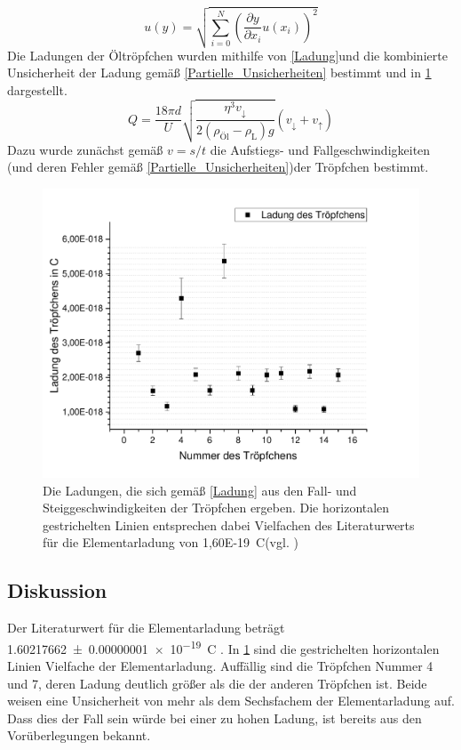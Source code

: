 \documentclass[
	a4paper,
	12pt,
	pagesize,
	ngerman
]{scrartcl}
\begin{document}
	\begin{equation}
	u(y) = \sqrt{  \sum_{i=0}^{N} \left( \frac{\partial y}{\partial x_i}u(x_i)\right)^2  }
	\label{Partielle_Unsicherheiten}
	\end{equation}
	Die Ladungen der Öltröpfchen wurden mithilfe von \cref{Ladung}und die kombinierte Unsicherheit der Ladung gemäß \cref{Partielle_Unsicherheiten}  bestimmt und in \cref{Tropf_Ladungen} dargestellt. %
	\begin{equation}
		Q=\frac{18 \pi d}{U} \sqrt{\frac{\eta^3 v_\downarrow}{2(\rho_\text{Öl}-\rho_\text{L})g}}(v_\downarrow + v_\uparrow)
		\label{Ladung}
	\end{equation}
	Dazu wurde zunächst gemäß $ v=s/t $ die Aufstiegs- und Fallgeschwindigkeiten (und deren Fehler gemäß \cref{Partielle_Unsicherheiten})der Tröpfchen bestimmt.
	\begin{figure}[H]
		\includegraphics[width=1\textwidth]{Troepfchenladungen}
		\centering
		\caption{Die Ladungen, die sich gemäß \cref{Ladung} aus den Fall- und Steiggeschwindigkeiten der Tröpfchen ergeben. Die horizontalen gestrichelten Linien entsprechen dabei Vielfachen des Literaturwerts für die Elementarladung von \SI{1,60E-19}{C}(vgl. \cite{Elementarladung})}
		\label{Tropf_Ladungen}
		\centering
	\end{figure} 
	


	\subsection{Diskussion}
	Der Literaturwert für die Elementarladung beträgt \SI{1,60217662 \pm 0,00000001 e-19}{C} \cite{Elementarladung}.
	In \cref{Tropf_Ladungen} sind die gestrichelten horizontalen Linien Vielfache der Elementarladung.
	Auffällig sind die Tröpfchen Nummer 4 und 7, deren Ladung deutlich größer als die der anderen Tröpfchen ist. 
	Beide weisen eine Unsicherheit von mehr als dem Sechsfachem der Elementarladung auf. 
	Dass dies der Fall sein würde bei einer zu hohen Ladung, ist bereits aus den Vorüberlegungen bekannt.
\end{document}
